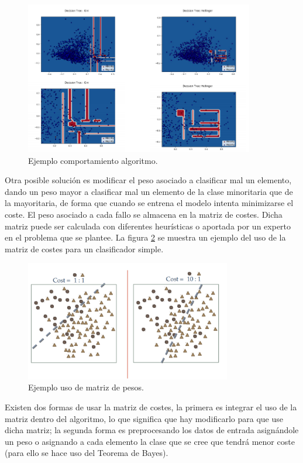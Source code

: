 \begin{figure}[H]
	\centering
	\includegraphics[width=100mm]{imagenes/hellinger-example.png}
	\caption{Ejemplo comportamiento algoritmo.}
	\label{fig:25}
\end{figure}
\verticalspace

Otra posible solución es modificar el peso asociado a clasificar mal un elemento, dando un peso mayor a clasificar mal un elemento de la clase minoritaria que de la mayoritaria, de forma que cuando se entrena el modelo intenta minimizarse el coste. El peso asociado a cada fallo se almacena en la matriz de costes. Dicha matriz puede ser calculada con diferentes heurísticas o aportada por un experto en el problema que se plantee. La figura \ref{fig:26} se muestra un ejemplo del uso de la matriz de costes para un clasificador simple.\newline

\begin{figure}[H]
	\centering
	\includegraphics[width=90mm]{imagenes/cost-sentitive.png}
	\caption{Ejemplo uso de matriz de pesos.}
	\label{fig:26}
\end{figure}
\verticalspace

Existen dos formas de usar la matriz de costes, la primera es integrar el uso de la matriz dentro del algoritmo, lo que significa que hay modificarlo para que use dicha matriz; la segunda forma es preprocesando los datos de entrada asignándole un peso o asignando a cada elemento la clase que se cree que tendrá menor coste (para ello se hace uso del Teorema de Bayes).

